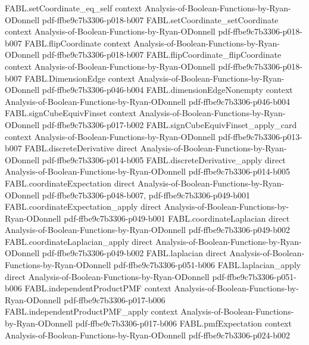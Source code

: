 \begin{theorem}
\proofstep
  {FABL.setCoordinate_eq_self}
  {context}
  {Analysis-of-Boolean-Functions-by-Ryan-ODonnell}
  {pdf-ffbe9c7b3306-p018-b007}
\proofstep
  {FABL.setCoordinate_setCoordinate}
  {context}
  {Analysis-of-Boolean-Functions-by-Ryan-ODonnell}
  {pdf-ffbe9c7b3306-p018-b007}
\proofstep
  {FABL.flipCoordinate}
  {context}
  {Analysis-of-Boolean-Functions-by-Ryan-ODonnell}
  {pdf-ffbe9c7b3306-p018-b007}
\proofstep
  {FABL.flipCoordinate_flipCoordinate}
  {context}
  {Analysis-of-Boolean-Functions-by-Ryan-ODonnell}
  {pdf-ffbe9c7b3306-p018-b007}
\proofstep
  {FABL.DimensionEdge}
  {context}
  {Analysis-of-Boolean-Functions-by-Ryan-ODonnell}
  {pdf-ffbe9c7b3306-p046-b004}
\proofstep
  {FABL.dimensionEdgeNonempty}
  {context}
  {Analysis-of-Boolean-Functions-by-Ryan-ODonnell}
  {pdf-ffbe9c7b3306-p046-b004}
\proofstep
  {FABL.signCubeEquivFinset}
  {context}
  {Analysis-of-Boolean-Functions-by-Ryan-ODonnell}
  {pdf-ffbe9c7b3306-p017-b002}
\proofstep
  {FABL.signCubeEquivFinset_apply_card}
  {context}
  {Analysis-of-Boolean-Functions-by-Ryan-ODonnell}
  {pdf-ffbe9c7b3306-p013-b007}
\proofstep
  {FABL.discreteDerivative}
  {direct}
  {Analysis-of-Boolean-Functions-by-Ryan-ODonnell}
  {pdf-ffbe9c7b3306-p014-b005}
\proofstep
  {FABL.discreteDerivative_apply}
  {direct}
  {Analysis-of-Boolean-Functions-by-Ryan-ODonnell}
  {pdf-ffbe9c7b3306-p014-b005}
\proofstep
  {FABL.coordinateExpectation}
  {direct}
  {Analysis-of-Boolean-Functions-by-Ryan-ODonnell}
  {pdf-ffbe9c7b3306-p048-b007,
    pdf-ffbe9c7b3306-p049-b001}
\proofstep
  {FABL.coordinateExpectation_apply}
  {direct}
  {Analysis-of-Boolean-Functions-by-Ryan-ODonnell}
  {pdf-ffbe9c7b3306-p049-b001}
\proofstep
  {FABL.coordinateLaplacian}
  {direct}
  {Analysis-of-Boolean-Functions-by-Ryan-ODonnell}
  {pdf-ffbe9c7b3306-p049-b002}
\proofstep
  {FABL.coordinateLaplacian_apply}
  {direct}
  {Analysis-of-Boolean-Functions-by-Ryan-ODonnell}
  {pdf-ffbe9c7b3306-p049-b002}
\proofstep
  {FABL.laplacian}
  {direct}
  {Analysis-of-Boolean-Functions-by-Ryan-ODonnell}
  {pdf-ffbe9c7b3306-p051-b006}
\proofstep
  {FABL.laplacian_apply}
  {direct}
  {Analysis-of-Boolean-Functions-by-Ryan-ODonnell}
  {pdf-ffbe9c7b3306-p051-b006}
\proofstep
  {FABL.independentProductPMF}
  {context}
  {Analysis-of-Boolean-Functions-by-Ryan-ODonnell}
  {pdf-ffbe9c7b3306-p017-b006}
\proofstep
  {FABL.independentProductPMF_apply}
  {context}
  {Analysis-of-Boolean-Functions-by-Ryan-ODonnell}
  {pdf-ffbe9c7b3306-p017-b006}
\proofstep
  {FABL.pmfExpectation}
  {context}
  {Analysis-of-Boolean-Functions-by-Ryan-ODonnell}
  {pdf-ffbe9c7b3306-p024-b002}

\end{theorem}
